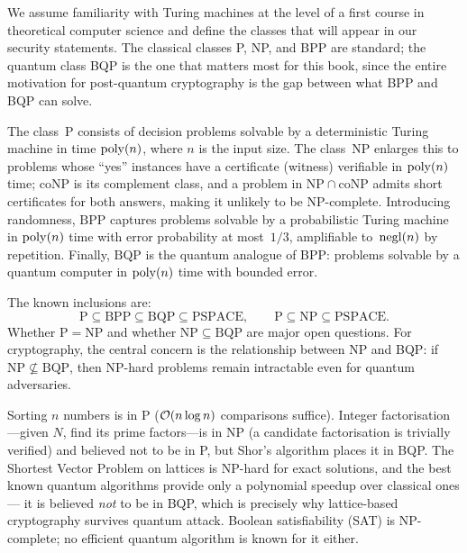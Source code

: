 We assume familiarity with Turing machines at the level of a first course in theoretical computer science and define the classes that will appear in our security statements.  The classical classes P, NP, and BPP are standard; the quantum class BQP is the one that matters most for this book, since the entire motivation for post-quantum cryptography is the gap between what BPP and BQP can solve.

\begin{definition}
\label{def:complexity-classes}
The class~$\mathrm{P}$ consists of decision problems solvable by a deterministic Turing machine in time $\operatorname{poly}(n)$, where $n$ is the input size.  The class~$\mathrm{NP}$ enlarges this to problems whose ``yes'' instances have a certificate (witness) verifiable in $\operatorname{poly}(n)$ time; $\mathrm{coNP}$ is its complement class, and a problem in $\mathrm{NP} \cap \mathrm{coNP}$ admits short certificates for both answers, making it unlikely to be NP-complete.  Introducing randomness, $\mathrm{BPP}$ captures problems solvable by a probabilistic Turing machine in $\operatorname{poly}(n)$ time with error probability at most~$1/3$, amplifiable to~$\operatorname{negl}(n)$ by repetition.  Finally, $\mathrm{BQP}$ is the quantum analogue of BPP: problems solvable by a quantum computer in $\operatorname{poly}(n)$ time with bounded error.
\end{definition}

The known inclusions are:
\begin{equation}
\label{eq:complexity-inclusions}
\mathrm{P} \subseteq \mathrm{BPP} \subseteq \mathrm{BQP} \subseteq \mathrm{PSPACE}, \qquad \mathrm{P} \subseteq \mathrm{NP} \subseteq \mathrm{PSPACE}.
\end{equation}
Whether $\mathrm{P} = \mathrm{NP}$ and whether $\mathrm{NP} \subseteq \mathrm{BQP}$ are major open questions.  For cryptography, the central concern is the relationship between NP and BQP: if $\mathrm{NP} \not\subseteq \mathrm{BQP}$, then NP-hard problems remain intractable even for quantum adversaries.

\begin{example}
\label{ex:complexity-examples}
Sorting $n$ numbers is in P ($\mathcal{O}(n \log n)$ comparisons suffice).  Integer factorisation---given $N$, find its prime factors---is in NP (a candidate factorisation is trivially verified) and believed not to be in P, but Shor's algorithm places it in BQP.  The Shortest Vector Problem on lattices is NP-hard for exact solutions, and the best known quantum algorithms provide only a polynomial speedup over classical ones --- it is believed \emph{not} to be in BQP, which is precisely why lattice-based cryptography survives quantum attack.  Boolean satisfiability (SAT) is NP-complete; no efficient quantum algorithm is known for it either.
\end{example}


